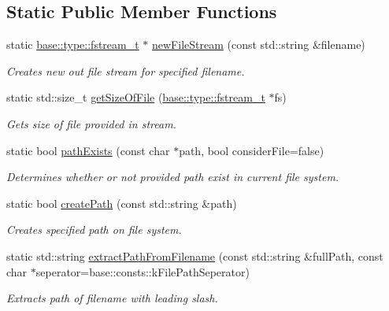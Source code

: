 \subsection*{Static Public Member Functions}
\begin{DoxyCompactItemize}
\item 
static \hyperlink{namespaceel_1_1base_1_1type_a620c830ead75d26b45c060c211ee2685}{base\+::type\+::fstream\+\_\+t} $\ast$ \hyperlink{classel_1_1base_1_1utils_1_1_file_aa4bef1f2e00269d75c1c1eabb0ce4563}{new\+File\+Stream} (const std\+::string \&filename)
\begin{DoxyCompactList}\small\item\em Creates new out file stream for specified filename. \end{DoxyCompactList}\item 
static std\+::size\+\_\+t \hyperlink{classel_1_1base_1_1utils_1_1_file_a54415ba02f698ba978795265f7f4b86c}{get\+Size\+Of\+File} (\hyperlink{namespaceel_1_1base_1_1type_a620c830ead75d26b45c060c211ee2685}{base\+::type\+::fstream\+\_\+t} $\ast$fs)
\begin{DoxyCompactList}\small\item\em Gets size of file provided in stream. \end{DoxyCompactList}\item 
static bool \hyperlink{classel_1_1base_1_1utils_1_1_file_a4fc9e36b814f1aeaa4931e35d58e5b45}{path\+Exists} (const char $\ast$path, bool consider\+File=false)
\begin{DoxyCompactList}\small\item\em Determines whether or not provided path exist in current file system. \end{DoxyCompactList}\item 
static bool \hyperlink{classel_1_1base_1_1utils_1_1_file_a34fbb5b06201c7e3db71db80e017fb96}{create\+Path} (const std\+::string \&path)
\begin{DoxyCompactList}\small\item\em Creates specified path on file system. \end{DoxyCompactList}\item 
static std\+::string \hyperlink{classel_1_1base_1_1utils_1_1_file_af541c62ed408de7e368d339f96c0c6cf}{extract\+Path\+From\+Filename} (const std\+::string \&full\+Path, const char $\ast$seperator=base\+::consts\+::k\+File\+Path\+Seperator)
\begin{DoxyCompactList}\small\item\em Extracts path of filename with leading slash. \end{DoxyCompactList}\item 

\end{DoxyCompactItemize}
